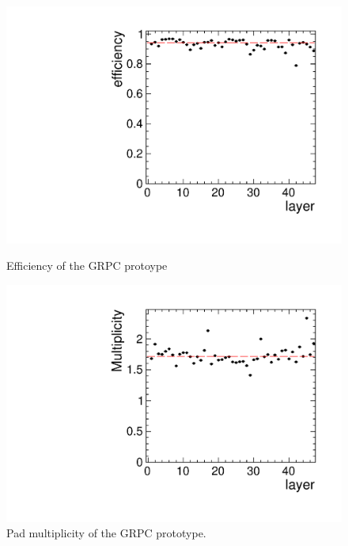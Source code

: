 \begin{figure}
 \begin{minipage}[t]{0.49\textwidth}
 \begin{center}
 \includegraphics*[width=\textwidth,keepaspectratio]{Calorimeter/SDHCAL_GRPC/figures/eff_layer_august_fit.pdf}
	\caption{Efficiency of the GRPC protoype}
 \end{center}
 \end{minipage}
 \label{fig:Calorimeter:SDHCAL_GRPC:Eff}
 \hspace{0.02\textwidth}
 \begin{minipage}[t]{0.49\textwidth}
 \begin{center}
 \includegraphics*[width=\textwidth,keepaspectratio]{Calorimeter/SDHCAL_GRPC/figures/mul_layer_august_fit.pdf}
 \caption{Pad multiplicity of the GRPC prototype. }
 \end{center}
 \end{minipage}
 \label{fig:Calorimeter:SDHCAL_GRPC:Mult}
 \end{figure}


